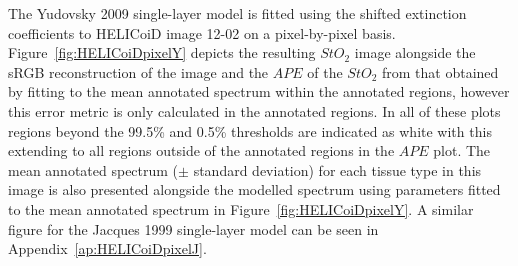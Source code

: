%

The Yudovsky 2009 single-layer model is fitted using the shifted extinction coefficients to HELICoiD image 12-02 on a pixel-by-pixel basis. Figure~\ref{fig:HELICoiDpixelY} depicts the resulting $StO_2$ image alongside the sRGB reconstruction of the image and the $APE$ of the $StO_2$ from that obtained by fitting to the mean annotated spectrum within the annotated regions, however this error metric is only calculated in the annotated regions. In all of these plots regions beyond the 99.5\% and 0.5\% thresholds are indicated as white with this extending to all regions outside of the annotated regions in the $APE$ plot. The mean annotated spectrum ($\pm$ standard deviation) for each tissue type in this image is also presented alongside the modelled spectrum using parameters fitted to the mean annotated spectrum in Figure~\ref{fig:HELICoiDpixelY}. A similar figure for the Jacques 1999 single-layer model can be seen in Appendix~\ref{ap:HELICoiDpixelJ}.

